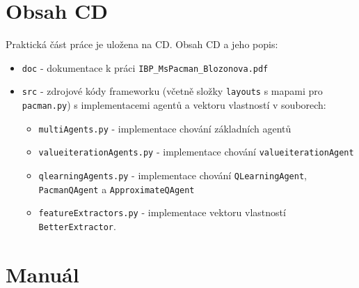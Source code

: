 \chapter{Obsah CD}
Praktická část práce je uložena na CD. Obsah CD a jeho popis:
\begin{itemize}
\item \texttt{doc} - dokumentace k práci \texttt{IBP\_MsPacman\_Blozonova.pdf}
\item \texttt{src} - zdrojové kódy frameworku (včetně složky \texttt{layouts} s mapami pro \texttt{pacman.py}) s implementacemi agentů a vektoru vlastností v souborech:
\begin{itemize}
\item \texttt{multiAgents.py} - implementace chování základních agentů
\item \texttt{valueiterationAgents.py} - implementace chování \texttt{valueiterationAgent}
\item \texttt{qlearningAgents.py} - implementace chování \texttt{QLearningAgent}, \texttt{PacmanQAgent} a \texttt{ApproximateQAgent}
\item \texttt{featureExtractors.py} - implementace vektoru vlastností \texttt{BetterExtractor}.
\end{itemize}
\end{itemize}

\chapter{Manuál}
\label{priloha:manual}
